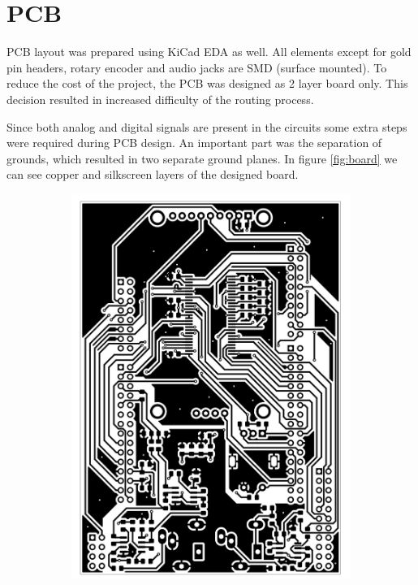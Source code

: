 \documentclass[a4paper,twoside,12pt]{book}
\begin{document}
\section{PCB}
PCB layout was prepared using KiCad EDA as well.
All elements except for gold pin headers,
rotary encoder and audio jacks are SMD (surface mounted).
To reduce the cost of the project, the PCB was designed as 2 layer board only.
This decision resulted in increased difficulty of the routing process.

Since both analog and digital signals are present in the circuits
some extra steps were required during PCB design.
An important part was the separation of grounds,
which resulted in two separate ground planes.
In figure \ref{fig:board} we can see copper and 
silkscreen layers of the designed board.

\begin{figure}[H]
    \centering
    \begin{subfigure}[h]{0.273\textwidth}
        \includegraphics[width=\textwidth]{images/Board_front}

\end{subfigure}
\end{figure}
\end{document}
